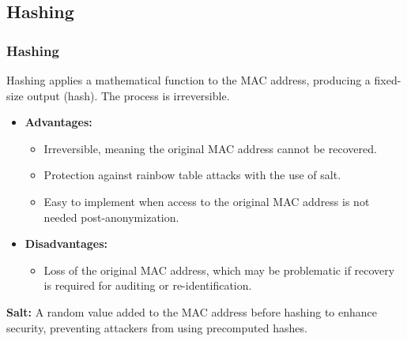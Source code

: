 \documentclass[
english,
svgnames,
notes=hide,
12pt]{beamer}
\begin{document}
\begin{frame}
  \section{Hashing}
  \frametitle{Hashing}
  Hashing applies a mathematical function to the MAC address, producing a fixed-size output (hash). The process is irreversible.
  \begin{itemize}
    \item \textbf{Advantages:} \pause
      \begin{itemize}
        \item Irreversible, meaning the original MAC address cannot be recovered. \pause
        \item Protection against rainbow table attacks with the use of salt. \pause
        \item Easy to implement when access to the original MAC address is not needed post-anonymization. \pause
      \end{itemize}
    \item \textbf{Disadvantages:} \pause
      \begin{itemize}
        \item Loss of the original MAC address, which may be problematic if recovery is required for auditing or re-identification. \pause
      \end{itemize}
  \end{itemize}
  \textbf{Salt:} A random value added to the MAC address before hashing to enhance security, preventing attackers from using precomputed hashes.
\end{frame}
\end{document}
